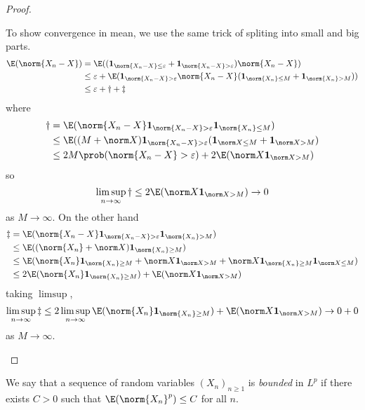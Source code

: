 \documentclass[a4paper]{article}
\renewcommand{\P}{\prob} %
\begin{document}
\begin{proof}
\begin{itemize}
    To show convergence in mean, we use the same trick of spliting into small and big parts.
    \begin{align*}
      \E(\norm{X_n - X})
      &= \E((\mathbf 1_{\norm{X_n - X} \leq \varepsilon} + \mathbf 1_{\norm{X_n - X} > \varepsilon}) \norm{X_n - X}) \\
      &\leq \varepsilon + \E(\mathbf 1_{\norm{X_n - X} > \varepsilon} \norm{X_n - X} (\mathbf 1_{\norm{X_n} \leq M} + \mathbf 1_{\norm{X_n} > M})) \\
      &\leq \varepsilon + \dagger + \ddagger
    \end{align*}
    where
    \begin{align*}
      \dagger
      &= \E(\norm{X_n - X} \mathbf 1_{\norm{X_n - X} > \varepsilon} \mathbf 1_{\norm{X_n} \leq M}) \\
      &\leq \E((M + \norm X) \mathbf 1_{\norm{X_n - X} > \varepsilon} (\mathbf 1_{\norm X \leq M} + \mathbf 1_{\norm X > M}) \\
      &\leq 2M \P(\norm{X_n - X} > \varepsilon) + 2 \E(\norm X \mathbf 1_{\norm X > M})
    \end{align*}
    so
    \[
      \limsup_{n \to \infty} \dagger \leq 2 \E(\norm X \mathbf 1_{\norm X > M}) \to 0
    \]
    as \(M \to \infty\). On the other hand
    \begin{align*}
      \ddagger
      &= \E(\norm{X_n - X} \mathbf 1_{\norm{X_n - X} > \varepsilon} \mathbf 1_{\norm{X_n} > M}) \\
      &\leq \E((\norm{X_n} + \norm X) \mathbf 1_{\norm{X_n} \geq M}) \\
      &\leq \E(\norm{X_n} \mathbf 1_{\norm{X_n} \geq M} + \norm X \mathbf 1_{\norm X > M} + \norm X \mathbf 1_{\norm{X_n} \geq M} \mathbf 1_{\norm X \leq M}) \\
      &\leq 2 \E(\norm{X_n} \mathbf 1_{\norm{X_n} \geq M}) + \E(\norm X \mathbf 1_{\norm X > M})
    \end{align*}
    taking \(\limsup\),
    \[
      \limsup_{n \to \infty} \ddagger
      \leq 2 \limsup_{n \to \infty} \E(\norm{X_n} \mathbf 1_{\norm{X_n} \geq M}) + \E(\norm X \mathbf 1_{\norm X > M}) \to 0 + 0
    \]
    as \(M \to \infty\).
  \end{itemize}
\end{proof}

\begin{definition}
  We say that a sequence of random variables \((X_n)_{n \geq 1}\) is \emph{bounded} in \(L^p\) if there exists \(C > 0\) such that \(\E(\norm{X_n}^p) \leq C\) for all \(n\).
\end{definition}
\end{document}
